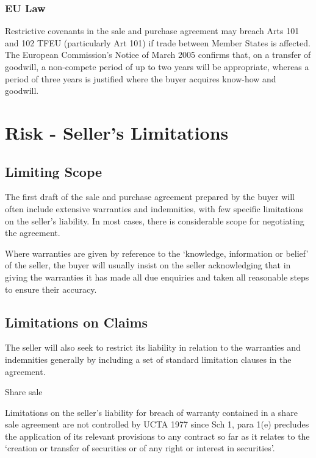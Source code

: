 \documentclass[
]{article}
\newenvironment{env-8890de02-1ba1-42c2-9b89-cb105d97c320}
{
    \savenotes\tcolorbox[blanker,breakable,left=5pt,borderline west={2pt}{-4pt}{cyan}]
}
{
    \endtcolorbox\spewnotes
}
\begin{document}
\hypertarget{eu-law}{%
\subsubsection{EU Law}\label{eu-law}}

Restrictive covenants in the sale and purchase agreement may breach Arts
101 and 102 TFEU (particularly Art 101) if trade between Member States
is affected. The European Commission's Notice of March 2005 confirms
that, on a transfer of goodwill, a non-compete period of up to two years
will be appropriate, whereas a period of three years is justified where
the buyer acquires know-how and goodwill.

\hypertarget{risk---sellers-limitations}{%
\section{Risk - Seller's Limitations}\label{risk---sellers-limitations}}

\hypertarget{limiting-scope}{%
\subsection{Limiting Scope}\label{limiting-scope}}

The first draft of the sale and purchase agreement prepared by the buyer
will often include extensive warranties and indemnities, with few
specific limitations on the seller's liability. In most cases, there is
considerable scope for negotiating the agreement.

Where warranties are given by reference to the `knowledge, information
or belief' of the seller, the buyer will usually insist on the seller
acknowledging that in giving the warranties it has made all due
enquiries and taken all reasonable steps to ensure their accuracy.

\hypertarget{limitations-on-claims}{%
\subsection{Limitations on Claims}\label{limitations-on-claims}}

The seller will also seek to restrict its liability in relation to the
warranties and indemnities generally by including a set of standard
limitation clauses in the agreement.

\begin{env-8890de02-1ba1-42c2-9b89-cb105d97c320}

Share sale

Limitations on the seller's liability for breach of warranty contained
in a share sale agreement are not controlled by UCTA 1977 since Sch 1,
para 1(e) precludes the application of its relevant provisions to any
contract so far as it relates to the `creation or transfer of securities
or of any right or interest in securities'.

\end{env-8890de02-1ba1-42c2-9b89-cb105d97c320}
\end{document}
